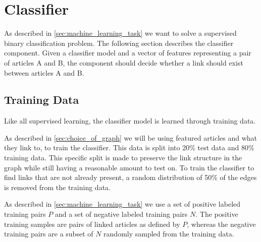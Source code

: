 \section{Classifier}\label{sec:classifier}
As described in \cref{sec:machine_learning_task} we want to solve a supervised binary classification problem. The following section describes the classifier component. Given a classifier model and a vector of features representing a pair of articles A and B, the component should decide whether a link should exist between articles A and B. 

\subsection{Training Data}\label{sec:training_data}
Like all supervised learning, the classifier model is learned through training data.

As described in \ref{sec:choice_of_graph} we will be using featured articles and what they link to, to train the classifier. This data is split into 20\% test data and 80\% training data. This specific split is made to preserve the link structure in the graph while still having a reasonable amount to test on. To train the classifier to find links that are not already present, a random distribution of 50\% of the edges is removed from the training data. 

As described in \cref{sec:machine_learning_task} we use a set of positive labeled training pairs $P$ and a set of negative labeled training pairs $N$. The positive training samples are pairs of linked articles as defined by $P$, whereas the negative training pairs are a subset of $N$ randomly sampled from the training data. 





